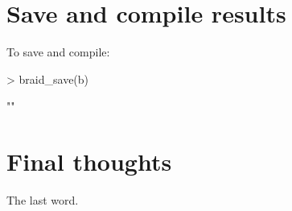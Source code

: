 \documentclass[a4paper]{article}
\begin{document}
\section{Save and compile results}

To save and compile:

\begin{Schunk}
\begin{Sinput}
> braid_save(b)
\end{Sinput}
\begin{Soutput}
[1] ""
\end{Soutput}
\end{Schunk}



\section{Final thoughts}

The last word.


\end{document}
